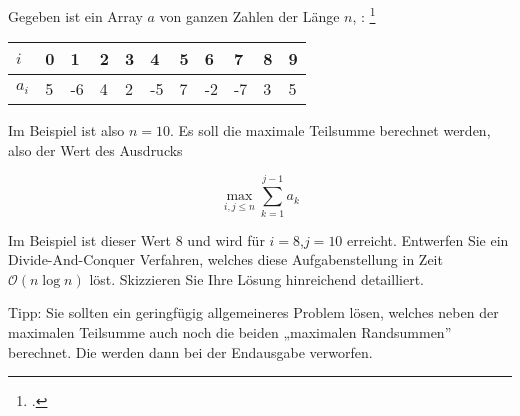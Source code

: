 \documentclass{bschlangaul-aufgabe}
\begin{document}

Gegeben ist ein Array $a$ von ganzen Zahlen der Länge $n$, \zB:
\footcite{examen:66115:2012:09}

\begin{center}
\begin{tabular}{l|llllllllll}
$i$  & 0  & 1  & 2 & 3 & 4  & 5 & 6  & 7  & 8 & 9\\\hline
$a_i$ & 5 & -6 & 4 & 2 & -5 & 7 & -2 & -7 & 3 & 5\\
\end{tabular}
\end{center}

\noindent
Im Beispiel ist also $n = 10$. Es soll die maximale Teilsumme berechnet
werden, also der Wert des Ausdrucks

\begin{displaymath}
\max_{i,j \leq n} \sum^{j-1}_{k=1} a_k
\end{displaymath}

\noindent
Im Beispiel ist dieser Wert $8$ und wird für $i = 8$,$j = 10$ erreicht.
Entwerfen Sie ein Divide-And-Conquer Verfahren, welches diese
Aufgabenstellung in Zeit $\mathcal{O}(n \log n)$ löst. Skizzieren Sie
Ihre Lösung hinreichend detailliert.

Tipp: Sie sollten ein geringfügig allgemeineres Problem lösen, welches
neben der maximalen Teilsumme auch noch die beiden „maximalen
Randsummen” berechnet. Die werden dann bei der Endausgabe verworfen.

\end{document}
